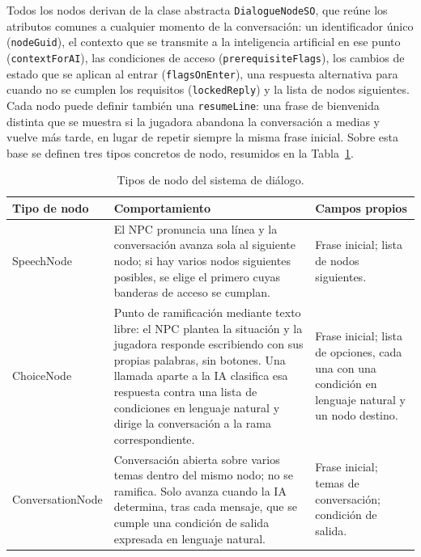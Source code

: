\documentclass[12pt,twoside,titlepage]{report}
\begin{document}
Todos los nodos derivan de la clase abstracta \texttt{DialogueNodeSO}, que reúne los atributos comunes a cualquier momento de la conversación: un identificador único (\texttt{nodeGuid}), el contexto que se transmite a la inteligencia artificial en ese punto (\texttt{contextForAI}), las condiciones de acceso (\texttt{prerequisiteFlags}), los cambios de estado que se aplican al entrar (\texttt{flagsOnEnter}), una respuesta alternativa para cuando no se cumplen los requisitos (\texttt{lockedReply}) y la lista de nodos siguientes. Cada nodo puede definir también una \texttt{resumeLine}: una frase de bienvenida distinta que se muestra si la jugadora abandona la conversación a medias y vuelve más tarde, en lugar de repetir siempre la misma frase inicial. Sobre esta base se definen tres tipos concretos de nodo, resumidos en la Tabla~\ref{tab:tipos_nodo}.

\begin{table}[h]
  \centering
  \caption{Tipos de nodo del sistema de diálogo.}
  \label{tab:tipos_nodo}
  \begin{footnotesize}
  \renewcommand{\arraystretch}{1.3}
  \begin{tabular}{p{2.6cm}p{6cm}p{4.5cm}}
    \hline
    \textbf{Tipo de nodo} & \textbf{Comportamiento} & \textbf{Campos propios} \\
    \hline
    SpeechNode & El NPC pronuncia una línea y la conversación avanza sola al siguiente nodo; si hay varios nodos siguientes posibles, se elige el primero cuyas banderas de acceso se cumplan. & Frase inicial; lista de nodos siguientes. \\
    \hline
    ChoiceNode & Punto de ramificación mediante texto libre: el NPC plantea la situación y la jugadora responde escribiendo con sus propias palabras, sin botones. Una llamada aparte a la IA clasifica esa respuesta contra una lista de condiciones en lenguaje natural y dirige la conversación a la rama correspondiente. & Frase inicial; lista de opciones, cada una con una condición en lenguaje natural y un nodo destino. \\
    \hline
    ConversationNode & Conversación abierta sobre varios temas dentro del mismo nodo; no se ramifica. Solo avanza cuando la IA determina, tras cada mensaje, que se cumple una condición de salida expresada en lenguaje natural. & Frase inicial; temas de conversación; condición de salida. \\
    \hline
  \end{tabular}
  \end{footnotesize}
\end{table}
\end{document}
